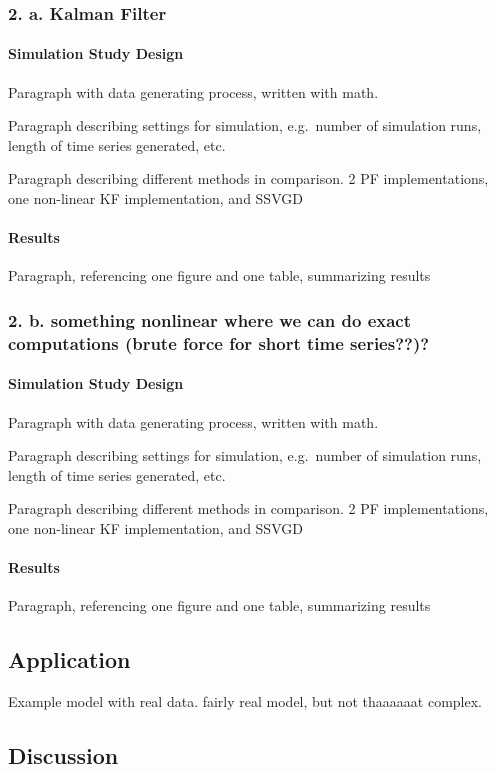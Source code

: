 \documentclass[]{article}
\let\oldparagraph\paragraph
\renewcommand{\paragraph}[1]{\oldparagraph{#1}\mbox{}}
\begin{document}
\subsubsection{2. a. Kalman Filter}\label{a.-kalman-filter}

\paragraph{Simulation Study Design}\label{simulation-study-design-3}

Paragraph with data generating process, written with math.

Paragraph describing settings for simulation, e.g.~number of simulation
runs, length of time series generated, etc.

Paragraph describing different methods in comparison. 2 PF
implementations, one non-linear KF implementation, and SSVGD

\paragraph{Results}\label{results-3}

Paragraph, referencing one figure and one table, summarizing results

\subsubsection{2. b. something nonlinear where we can do exact
computations (brute force for short time
series??)?}\label{b.-something-nonlinear-where-we-can-do-exact-computations-brute-force-for-short-time-series}

\paragraph{Simulation Study Design}\label{simulation-study-design-4}

Paragraph with data generating process, written with math.

Paragraph describing settings for simulation, e.g.~number of simulation
runs, length of time series generated, etc.

Paragraph describing different methods in comparison. 2 PF
implementations, one non-linear KF implementation, and SSVGD

\paragraph{Results}\label{results-4}

Paragraph, referencing one figure and one table, summarizing results

\subsection{Application}\label{application}

Example model with real data. fairly real model, but not thaaaaaat
complex.

\subsection{Discussion}\label{discussion}
\end{document}
